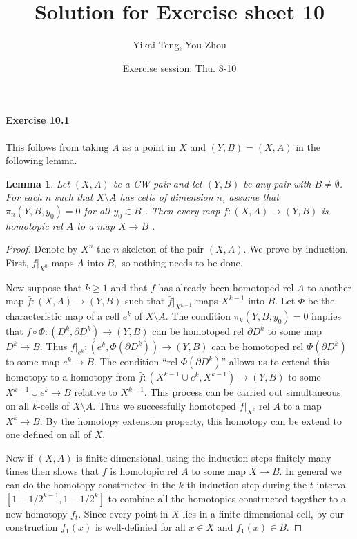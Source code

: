 \documentclass{article}
\title{Solution for Exercise sheet 10}
\author{Yikai Teng, You Zhou}
\date{Exercise session: Thu. 8-10}
\newtheorem*{lem}{Lemma}
\begin{document}
\maketitle
\paragraph{Exercise 10.1}
This follows from taking $A$ as a point in $X$ and $(Y,B)=(X,A)$ in the following lemma.
\begin{lem}
Let $(X,A)$ be a CW pair and let $(Y, B)$ be any pair with $B\neq\emptyset$. For
each $n$ such that $X \setminus A$ has cells of dimension $n$, assume that $\pi_n(Y, B,y_0) = 0$ for
all $y_0 \in B$ . Then every map $f \colon (X,A)\rightarrow(Y, B)$ is homotopic rel $A$ to a map $X\rightarrow B$ .
\end{lem}
\begin{proof}
  Denote by $X^n$ the $n$-skeleton of the pair $(X,A).$ We prove by induction. First, $f|_{X^0}$ maps $A$ into $B,$ so nothing needs to be done.

  Now suppose that $k\geq1$ and that $f$ has already been homotoped rel $A$ to another map $\bar{f}\colon(X,A)\rightarrow (Y,B)$ such that $\bar{f}|_{X^{k-1}}$ maps $X^{k-1}$ into $B.$ Let $\Phi$ be the characteristic map of a cell $e^k$ of $X\setminus A.$ The condition $\pi_k(Y, B,y_0) = 0$ implies that $\bar{f}\circ\Phi\colon(D^k,\partial D^k)\rightarrow(Y,B)$ can be homotoped rel $\partial D^k$ to some map $D^k\rightarrow B.$ Thus $\bar{f}|_{e^k}\colon(e^k,\Phi(\partial D^k))\rightarrow (Y,B)$ can be homotoped rel $\Phi(\partial D^k)$ to some map $e^k\rightarrow B.$ The condition ``rel $\Phi(\partial D^k)$'' allows us to extend this homotopy to a homotopy from $\bar{f}\colon(X^{k-1}\cup e^k,X^{k-1})\rightarrow (Y,B)$ to some $X^{k-1}\cup e^{k}\rightarrow B$ relative to $X^{k-1}$. This process can be carried out simultaneous on all $k$-cells of $X\setminus A.$ Thus we successfully homotoped $\bar{f}|_{X^k}$ rel $A$ to a map $X^k\rightarrow B.$ By the homotopy extension property, this homotopy can be extend to one defined on all of $X.$

  Now if $(X,A)$ is finite-dimensional, using the induction steps finitely many times then shows that $f$ is homotopic rel $A$ to some map $X\rightarrow B.$ In general we can do the homotopy constructed in the $k$-th induction step during the $t$-interval $[1-1/2^{k-1},1-1/2^k]$ to combine all the homotopies constructed together to a new homotopy $f_t$. Since every point in $X$ lies in a finite-dimensional cell, by our construction $f_1(x)$ is well-definied for all $x\in X$ and $f_1(x)\in B.$
\end{proof}
\end{document}

